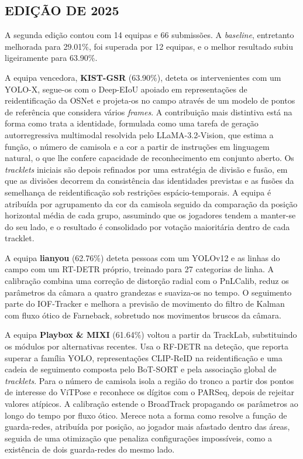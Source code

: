 \subsection{EDIÇÃO DE 2025}

A segunda edição contou com 14 equipas e 66 submissões. A \emph{baseline}, entretanto
melhorada para 29.01\%, foi superada por 12 equipas, e o melhor resultado subiu ligeiramente
para 63.90\%.

A equipa vencedora, \textbf{KIST-GSR} (63.90\%), deteta os intervenientes com um YOLO-X,
segue-os com o Deep-EIoU apoiado em representações de reidentificação da OSNet e projeta-os
no campo através de um modelo de pontos de referência que considera vários \emph{frames}.
A contribuição mais distintiva está na forma como trata a identidade, formulada como uma
tarefa de geração autorregressiva multimodal resolvida pelo LLaMA-3.2-Vision, que estima a
função, o número de camisola e a cor a partir de instruções em linguagem natural, o que lhe
confere capacidade de reconhecimento em conjunto aberto. Os \emph{tracklets} iniciais são
depois refinados por uma estratégia de divisão e fusão, em que as divisões decorrem da
consistência das identidades previstas e as fusões da semelhança de reidentificação sob
restrições espácio-temporais. A equipa é atribuída por agrupamento da cor da camisola
seguido da comparação da posição horizontal média de cada grupo, assumindo que os jogadores
tendem a manter-se do seu lado, e o resultado é consolidado por votação maioritária dentro
de cada tracklet.

A equipa \textbf{lianyou} (62.76\%) deteta pessoas com um YOLOv12 e as linhas do campo com
um RT-DETR próprio, treinado para 27 categorias de linha. A calibração combina uma correção
de distorção radial com o PnLCalib, reduz os parâmetros da câmara a quatro grandezas e
suaviza-os no tempo. O seguimento parte do IOF-Tracker e melhora a previsão de movimento do
filtro de Kalman com fluxo ótico de Farneback, sobretudo nos movimentos bruscos da câmara.

A equipa \textbf{Playbox \& MIXI} (61.64\%) voltou a partir da TrackLab, substituindo os
módulos por alternativas recentes. Usa o RF-DETR na deteção, que reporta superar a família
YOLO, representações CLIP-ReID na reidentificação e uma cadeia de seguimento composta pelo
BoT-SORT e pela associação global de \emph{tracklets}. Para o número de camisola isola a
região do tronco a partir dos pontos de interesse do ViTPose e reconhece os dígitos com o
PARSeq, depois de rejeitar valores atípicos. A calibração estende o BroadTrack propagando
os parâmetros ao longo do tempo por fluxo ótico. Merece nota a forma como resolve a função
de guarda-redes, atribuída por posição, ao jogador mais afastado dentro das áreas, seguida
de uma otimização que penaliza configurações impossíveis, como a existência de dois
guarda-redes do mesmo lado.

